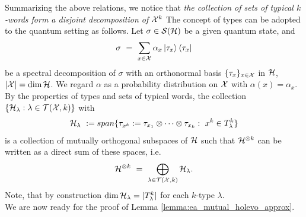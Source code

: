 Summarizing the above relations, we notice that \emph{the collection of sets of typical $k$-words form a disjoint decomposition of} ${\mathcal X}^k$
The concept of types can be adopted to the quantum setting as follows. Let $\sigma \in {\mathcal S}({\mathcal H})$ be a given quantum state, and 
\begin{align*}
 \sigma \ = \ \sum_{x \in {\mathcal X}} \alpha_x \ket{\tau_x}\bra{\tau_x} 
\end{align*} 
be a spectral decomposition of $\sigma$ with an orthonormal basis $\{\tau_x\}_{x \in {\mathcal X}}$ in ${\mathcal H}$, $|{\mathcal X}| = \dim {\mathcal H}$.
We regard $\alpha$ as a probability distribution on ${\mathcal X}$ with $\alpha(x) = \alpha_x$. By the properties 
of types and sets of typical words, the collection $\{{\mathcal H}_\lambda: \lambda \in {\mathcal T}({\mathcal X},k)\}$ with
\begin{align*}
{\mathcal H}_\lambda \ := span \{\tau_{x^k} := \tau_{x_1}\otimes \cdots \otimes \tau_{x_k}: \ x^k \in T_\lambda^k\}
\end{align*}
is a collection of mutually orthogonal subspaces of ${\mathcal H}$ such that ${\mathcal H}^{\otimes k}$ can be written as a direct sum
of these spaces, i.e. 
\begin{align*}
{\mathcal H}^{\otimes k} \ = \ \bigoplus_{\lambda \in {\mathcal T}({\mathcal X}, k)} {\mathcal H}_\lambda.
\end{align*}
Note, that by construction $\dim {\mathcal H}_\lambda = |T_\lambda^k|$ for each $k$-type $\lambda$. \\
We are now ready for the proof of Lemma \ref{lemma:ea_mutual_holevo_approx}. 
